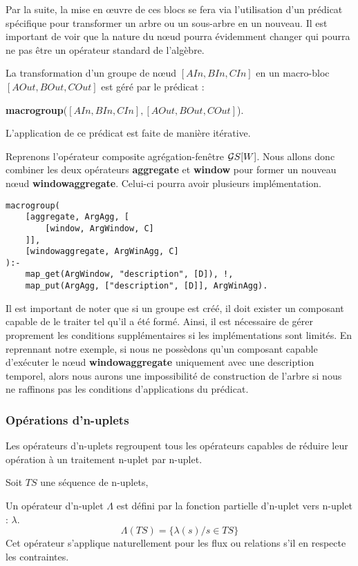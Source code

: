 Par la suite, la mise en œuvre de ces blocs se fera via l'utilisation d'un prédicat spécifique pour transformer un arbre ou un sous-arbre en un nouveau. Il est important de voir que la nature du nœud pourra évidemment changer qui pourra ne pas être un opérateur standard de l'algèbre.
\begin{regle}
La transformation d'un groupe de nœud $[AIn,BIn,CIn]$ en un macro-bloc $[AOut,BOut,COut]$ est géré par le prédicat :
\begin{center} \textbf{macrogroup}($[AIn,BIn,CIn],[AOut,BOut,COut]$).\end{center}
L'application de ce prédicat est faite de manière itérative.
\end{regle}
\begin{example}
    Reprenons l'opérateur composite agrégation-fenêtre $\mathcal{G} S[W]$. Nous allons donc combiner les deux opérateurs \textbf{aggregate} et \textbf{window} pour former un nouveau nœud \textbf{windowaggregate}. Celui-ci pourra avoir plusieurs implémentation.
    \begin{lstlisting}
macrogroup(
    [aggregate, ArgAgg, [
        [window, ArgWindow, C]
    ]], 
    [windowaggregate, ArgWinAgg, C]
):-
    map_get(ArgWindow, "description", [D]), !,
    map_put(ArgAgg, ["description", [D]], ArgWinAgg).
    \end{lstlisting}
\end{example}
Il est important de noter que si un groupe est créé, il doit exister un composant capable de le traiter tel qu'il a été formé. Ainsi, il est nécessaire de gérer proprement les conditions supplémentaires si les implémentations sont limités. En reprennant notre exemple, si nous ne possèdons qu'un composant capable d'exécuter le nœud \textbf{windowaggregate} uniquement avec une description temporel, alors nous aurons une impossibilité de construction de l'arbre si nous ne raffinons pas les conditions d'applications du prédicat.

\subsubsection{Opérations d'n-uplets}
Les opérateurs d'n-uplets regroupent tous les opérateurs capables de réduire leur opération à un traitement n-uplet par n-uplet.
\begin{defi}\label{def:operateurtuple}
    Soit $TS$ une séquence de n-uplets,

    Un opérateur d'n-uplet $\Lambda$ est défini par la fonction partielle d'n-uplet vers n-uplet : $\lambda$.
    $$\Lambda(TS) = \{\lambda(s) / s \in TS \}$$
    Cet opérateur s'applique naturellement pour les flux ou relations s'il en respecte les contraintes.
\end{defi}

